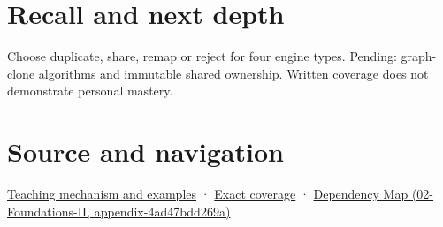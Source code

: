 \section{Recall and next depth}\label{appendix-1340cd1ce582-recall-and-next-depth}

Choose duplicate, share, remap or reject for four engine types. Pending: graph-clone algorithms and immutable shared ownership. Written coverage does not demonstrate personal mastery.

\section{Source and navigation}\label{appendix-1340cd1ce582-source-and-navigation}

\href{Continuous\%20Notes/Computing\%20Foundations\%20-\%20From\%20Bits\%20to\%20C++\%20and\%20Systems\%20APIs\#Copy\%20a\%20meaning\%20rather\%20than\%20just\%20its\%20bytes}{Teaching mechanism and examples} · \hyperref[appendix-fd090d982a15-m009---parts-127-147]{Exact coverage} · \href{../02-Foundations-II/main.pdf\#nameddest=appendix-4ad47bdd269a}{Dependency Map (02-Foundations-II, appendix-4ad47bdd269a)}
